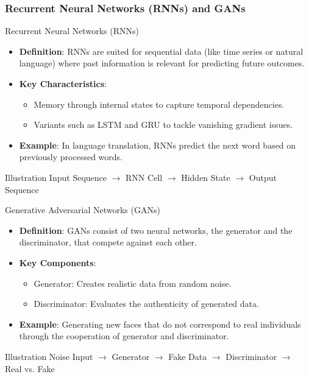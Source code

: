 \documentclass[aspectratio=169]{beamer}
\begin{document}
\begin{frame}[fragile]
    \frametitle{Recurrent Neural Networks (RNNs) and GANs}
    
    \begin{block}{Recurrent Neural Networks (RNNs)}
        \begin{itemize}
            \item \textbf{Definition}: RNNs are suited for sequential data (like time series or natural language) where past information is relevant for predicting future outcomes.
            \item \textbf{Key Characteristics}:
                \begin{itemize}
                    \item Memory through internal states to capture temporal dependencies.
                    \item Variants such as LSTM and GRU to tackle vanishing gradient issues.
                \end{itemize}
            \item \textbf{Example}: In language translation, RNNs predict the next word based on previously processed words.
        \end{itemize}
        \begin{block}{Illustration}
            Input Sequence $\rightarrow$ RNN Cell $\rightarrow$ Hidden State $\rightarrow$ Output Sequence
        \end{block}
    \end{block}

    \begin{block}{Generative Adversarial Networks (GANs)}
        \begin{itemize}
            \item \textbf{Definition}: GANs consist of two neural networks, the generator and the discriminator, that compete against each other.
            \item \textbf{Key Components}:
                \begin{itemize}
                    \item Generator: Creates realistic data from random noise.
                    \item Discriminator: Evaluates the authenticity of generated data.
                \end{itemize}
            \item \textbf{Example}: Generating new faces that do not correspond to real individuals through the cooperation of generator and discriminator.
        \end{itemize}
        \begin{block}{Illustration}
            Noise Input $\rightarrow$ Generator $\rightarrow$ Fake Data $\rightarrow$ Discriminator $\rightarrow$ Real vs. Fake
        \end{block}
    \end{block}
\end{frame}
\end{document}
